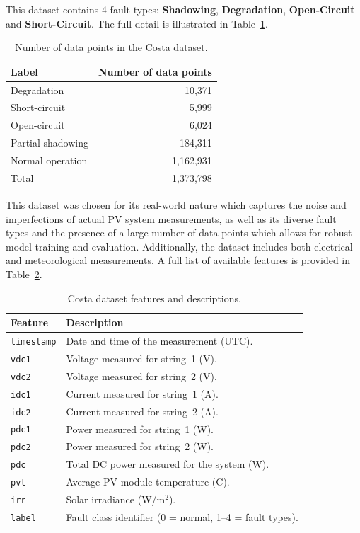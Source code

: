 This dataset contains 4 fault types: \textbf{Shadowing}, \textbf{Degradation}, \textbf{Open-Circuit} and \textbf{Short-Circuit}. The full detail is illustrated in Table~\ref{tab:costa_label_counts}.

\begin{table}[H]
    \centering
    \caption{Number of data points in the Costa dataset.}
    \label{tab:costa_label_counts}
    \begin{tabular}{l r}
        \toprule
        Label & Number of data points \\
        \midrule
        Degradation & 10,371 \\
        Short-circuit & 5,999 \\
        Open-circuit & 6,024 \\
        Partial shadowing & 184,311 \\
        Normal operation & 1,162,931 \\
        \midrule
        Total &  1,373,798 \\
        \bottomrule
    \end{tabular}
\end{table}

This dataset was chosen for its real-world nature which captures the noise and imperfections of actual PV system measurements, as well as its diverse fault types
and the presence of a large number of data points which allows for robust model training and evaluation. Additionally, the dataset includes both electrical and meteorological measurements. A full list of available features is provided in Table~\ref{tab:costa_features}.

\begin{table}[H]
    \centering
    \caption{Costa dataset features and descriptions.}
    \label{tab:costa_features}
    \begin{tabular}{lp{9cm}}
        \toprule
        \textbf{Feature} & \textbf{Description} \\
        \midrule
        \texttt{timestamp} & Date and time of the measurement (UTC). \\
        \texttt{vdc1} & Voltage measured for string~1 (V). \\
        \texttt{vdc2} & Voltage measured for string~2 (V). \\
        \texttt{idc1} & Current measured for string~1 (A). \\
        \texttt{idc2} & Current measured for string~2 (A). \\
        \texttt{pdc1} & Power measured for string~1 (W). \\
        \texttt{pdc2} & Power measured for string~2 (W). \\
        \texttt{pdc}  & Total DC power measured for the system (W). \\
        \texttt{pvt}  & Average PV module temperature (\textdegree{}C). \\
        \texttt{irr}  & Solar irradiance (W/m$^2$). \\
        \texttt{label} & Fault class identifier (0 = normal, 1--4 = fault types). \\
        \bottomrule
    \end{tabular}
\end{table}


